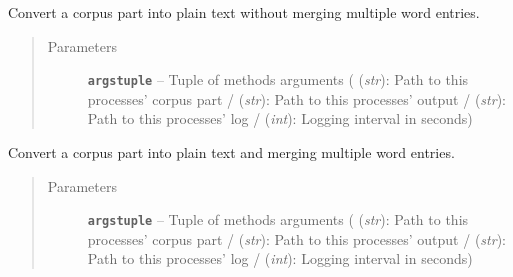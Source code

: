 \documentclass[letterpaper,10pt,english]{sphinxmanual}
\begin{document}

\begin{fulllineitems}
\label{src.prep.corpus:src.prep.corpus.convert_to_plain.convert_part}
Convert a corpus part into plain text without merging multiple word entries.
\begin{quote}\begin{description}
\item[{Parameters}] \leavevmode
\textbf{\texttt{argstuple}} -- Tuple of methods arguments ( (\emph{str}): Path to this processes' corpus part / 
(\emph{str}): Path to this processes' output /  (\emph{str}): Path to this processes' log / 
(\emph{int}): Logging interval in seconds)

\end{description}\end{quote}

\end{fulllineitems}


\begin{fulllineitems}
\label{src.prep.corpus:src.prep.corpus.convert_to_plain.convert_part_merging}
Convert a corpus part into plain text and merging multiple word entries.
\begin{quote}\begin{description}
\item[{Parameters}] \leavevmode
\textbf{\texttt{argstuple}} -- Tuple of methods arguments ( (\emph{str}): Path to this processes' corpus part / 
(\emph{str}): Path to this processes' output /  (\emph{str}): Path to this processes' log / 
(\emph{int}): Logging interval in seconds)

\end{description}\end{quote}

\end{fulllineitems}

\end{document}

